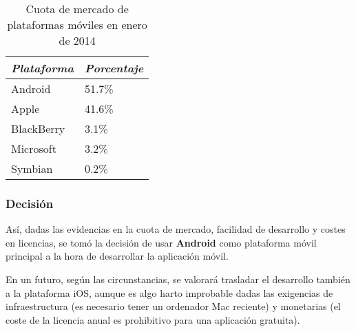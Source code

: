 \begin{table}[hbtp]
  \centering
  \begin{tabular}[h]{|l|l|}
    \hline
    \textit{Plataforma} & \textit{Porcentaje} \\
    \hline
    Android & 51.7\% \\
    Apple & 41.6\% \\
    BlackBerry & 3.1\% \\
    Microsoft & 3.2\% \\
    Symbian & 0.2\% \\
    \hline
  \end{tabular}
  \caption{Cuota de mercado de plataformas móviles en enero de 2014}
  \label{tab:cuota-2014}
\end{table}

\subsubsection{Decisión}

Así, dadas las evidencias en la cuota de mercado, facilidad de desarrollo y
costes en licencias, se tomó la decisión de usar \textbf{Android} como
plataforma móvil principal a la hora de desarrollar la aplicación móvil.

En un futuro, según las circunstancias, se valorará trasladar el desarrollo
también a la plataforma iOS, aunque es algo harto improbable dadas las
exigencias de infraestructura (es necesario tener un ordenador Mac reciente) y
monetarias (el coste de la licencia anual es prohibitivo para una aplicación
gratuita).

